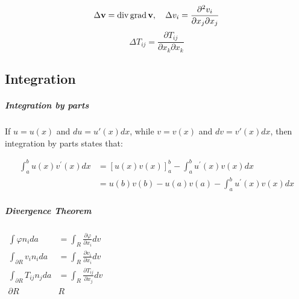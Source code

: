 \[\Delta \mathbf{v}=\operatorname{div} \operatorname{grad} \mathbf{v}, \quad \Delta v_{i}=\frac{\partial^{2} v_{i}}{\partial x_{j} \partial x_{j}}\\\]
\[\Delta T_{i j}=\frac{\partial T_{i j}}{\partial x_{k} \partial x_{k}}\]

\hypertarget{integration}{%
\subsection{Integration}\label{integration}}

\hypertarget{integration-by-parts}{%
\subparagraph{Integration by parts}\label{integration-by-parts}}

If \(u = u(x)\) and \(du = u'(x) dx\), while \(v = v(x)\) and
\(dv = v'(x) dx\), then integration by parts states that:

\[\begin{aligned}
\int_{a}^{b} u(x) v^{\prime}(x) d x &=[u(x) v(x)]_{a}^{b}-\int_{a}^{b} u^{\prime}(x) v(x) d x \\
&=u(b) v(b)-u(a) v(a)-\int_{a}^{b} u^{\prime}(x) v(x) d x
\end{aligned}\]

\hypertarget{divergence-theorem}{%
\subparagraph{Divergence Theorem}\label{divergence-theorem}}

\(\begin{array}{rl}{\int \varphi n_{i} d a} & {=\int_{R} \frac{\partial \varphi}{\partial x_{i}} d v} \\ {\int_{\partial R} v_{i} n_{i} d a} & {=\int_{R} \frac{\partial v_{i}}{\partial x_{i}} d v} \\ {\int_{\partial R} T_{i j} n_{j} d a} & {=\int_{R} \frac{\partial T_{i j}}{\partial x_{j}} d v} \\ {\partial R} & {R}\end{array}\)

